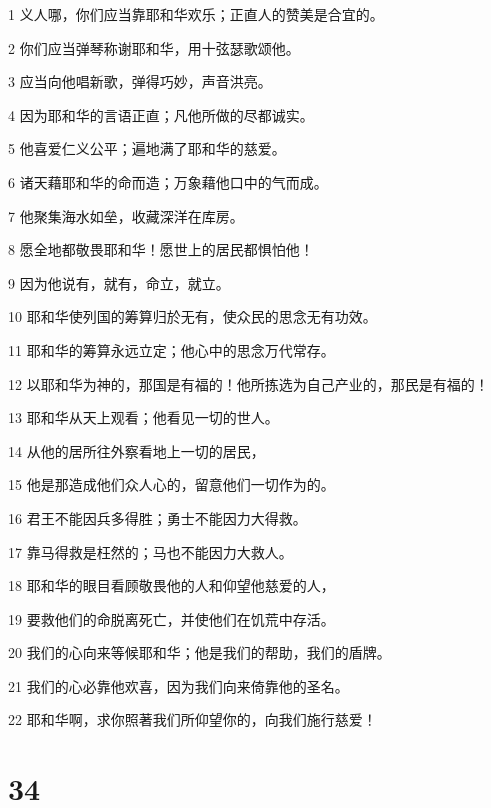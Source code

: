 \par 1 义人哪，你们应当靠耶和华欢乐；正直人的赞美是合宜的。
\par 2 你们应当弹琴称谢耶和华，用十弦瑟歌颂他。
\par 3 应当向他唱新歌，弹得巧妙，声音洪亮。
\par 4 因为耶和华的言语正直；凡他所做的尽都诚实。
\par 5 他喜爱仁义公平；遍地满了耶和华的慈爱。
\par 6 诸天藉耶和华的命而造；万象藉他口中的气而成。
\par 7 他聚集海水如垒，收藏深洋在库房。
\par 8 愿全地都敬畏耶和华！愿世上的居民都惧怕他！
\par 9 因为他说有，就有，命立，就立。
\par 10 耶和华使列国的筹算归於无有，使众民的思念无有功效。
\par 11 耶和华的筹算永远立定；他心中的思念万代常存。
\par 12 以耶和华为神的，那国是有福的！他所拣选为自己产业的，那民是有福的！
\par 13 耶和华从天上观看；他看见一切的世人。
\par 14 从他的居所往外察看地上一切的居民，
\par 15 他是那造成他们众人心的，留意他们一切作为的。
\par 16 君王不能因兵多得胜；勇士不能因力大得救。
\par 17 靠马得救是枉然的；马也不能因力大救人。
\par 18 耶和华的眼目看顾敬畏他的人和仰望他慈爱的人，
\par 19 要救他们的命脱离死亡，并使他们在饥荒中存活。
\par 20 我们的心向来等候耶和华；他是我们的帮助，我们的盾牌。
\par 21 我们的心必靠他欢喜，因为我们向来倚靠他的圣名。
\par 22 耶和华啊，求你照著我们所仰望你的，向我们施行慈爱！

\chapter{34}

